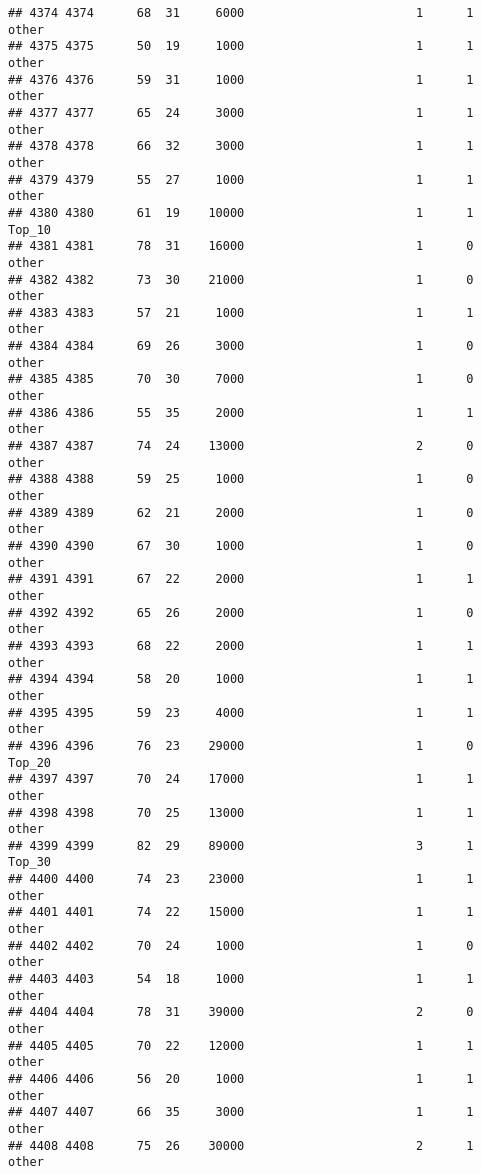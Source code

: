 \documentclass[
]{article}
\begin{document}
\begin{verbatim}
## 4374 4374      68  31     6000                        1      1    other
## 4375 4375      50  19     1000                        1      1    other
## 4376 4376      59  31     1000                        1      1    other
## 4377 4377      65  24     3000                        1      1    other
## 4378 4378      66  32     3000                        1      1    other
## 4379 4379      55  27     1000                        1      1    other
## 4380 4380      61  19    10000                        1      1   Top_10
## 4381 4381      78  31    16000                        1      0    other
## 4382 4382      73  30    21000                        1      0    other
## 4383 4383      57  21     1000                        1      1    other
## 4384 4384      69  26     3000                        1      0    other
## 4385 4385      70  30     7000                        1      0    other
## 4386 4386      55  35     2000                        1      1    other
## 4387 4387      74  24    13000                        2      0    other
## 4388 4388      59  25     1000                        1      0    other
## 4389 4389      62  21     2000                        1      0    other
## 4390 4390      67  30     1000                        1      0    other
## 4391 4391      67  22     2000                        1      1    other
## 4392 4392      65  26     2000                        1      0    other
## 4393 4393      68  22     2000                        1      1    other
## 4394 4394      58  20     1000                        1      1    other
## 4395 4395      59  23     4000                        1      1    other
## 4396 4396      76  23    29000                        1      0   Top_20
## 4397 4397      70  24    17000                        1      1    other
## 4398 4398      70  25    13000                        1      1    other
## 4399 4399      82  29    89000                        3      1   Top_30
## 4400 4400      74  23    23000                        1      1    other
## 4401 4401      74  22    15000                        1      1    other
## 4402 4402      70  24     1000                        1      0    other
## 4403 4403      54  18     1000                        1      1    other
## 4404 4404      78  31    39000                        2      0    other
## 4405 4405      70  22    12000                        1      1    other
## 4406 4406      56  20     1000                        1      1    other
## 4407 4407      66  35     3000                        1      1    other
## 4408 4408      75  26    30000                        2      1    other

\end{verbatim}
\end{document}
